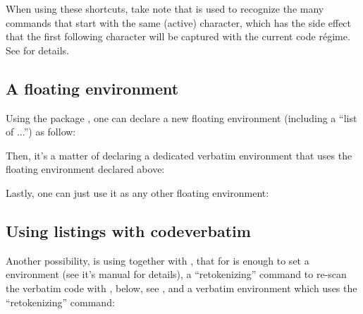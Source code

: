 
\begin{tsremark}
  When using these shortcuts, take note that  is used to recognize the many commands that start with the same (active) character, which has the side effect that the first following character will be captured with the current code régime. See  for details.
\end{tsremark}

\subsection{A floating environment}

Using the package , one can declare a new floating environment (including a ``list of ...'') as follow:


Then, it's a matter of declaring a dedicated verbatim environment that uses the floating environment declared above:


Lastly, one can just use it as any other floating environment:

\begin{codestore}[demofloat]
\end{codestore}



\subsection{Using listings with codeverbatim}
Another possibility, is using  together with , that for is enough to set a  environment (see it's manual for details), a ``retokenizing'' command to re-scan the verbatim code with , \tsobj{\cvRetokenEnvNewCommand} below, see , and a verbatim environment which uses the ``retokenizing'' command:

